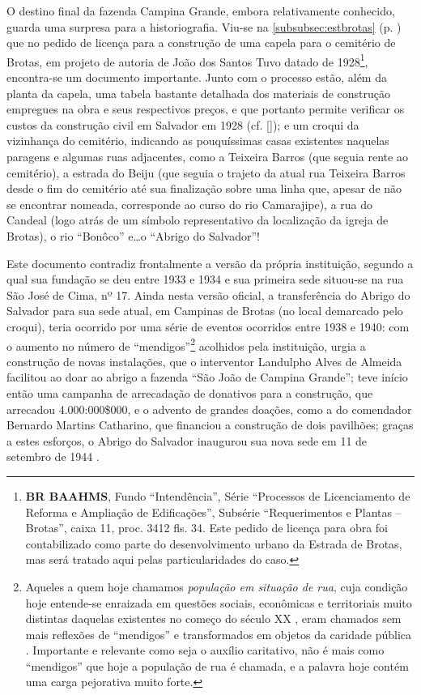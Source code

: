 O destino final da fazenda Campina Grande, embora relativamente conhecido, guarda uma surpresa para a historiografia. Viu-se na \autoref{subsubsec:estbrotas} (p. \pageref{subsubsec:estbrotas}) que no pedido de licença para a construção de uma capela para o cemitério de Brotas, em projeto de autoria de João dos Santos Tuvo datado de 1928\footnote{\textbf{BR BAAHMS}, Fundo ``Intendência'', Série ``Processos de Licenciamento de Reforma e Ampliação de Edificações'', Subsérie ``Requerimentos e Plantas -- Brotas'', caixa 11, proc. 3412 fls. 34. Este pedido de licença para obra foi contabilizado como parte do desenvolvimento urbano da Estrada de Brotas, mas será tratado aqui pelas particularidades do caso.}, encontra-se um documento importante. Junto com o processo estão, além da planta da capela, uma tabela bastante detalhada dos materiais de construção empregues na obra e seus respectivos preços, e que portanto permite verificar os custos da construção civil em Salvador em 1928 (cf. \autoref{}); e um croqui da vizinhança do cemitério, indicando as pouquíssimas casas existentes naquelas paragens e algumas ruas adjacentes, como a Teixeira Barros (que seguia rente ao cemitério), a estrada do Beiju (que seguia o trajeto da atual rua Teixeira Barros desde o fim do cemitério até sua finalização sobre uma linha que, apesar de não se encontrar nomeada, corresponde ao curso do rio Camarajipe), a rua do Candeal (logo atrás de um símbolo representativo da localização da igreja de Brotas), o rio ``Bonôco'' e\dots o ``Abrigo do Salvador''!

Este documento contradiz frontalmente a versão da própria instituição, segundo a qual sua fundação se deu entre 1933 e 1934 e sua primeira sede situou-se na rua São José de Cima, nº 17. Ainda nesta versão oficial, a transferência do Abrigo do Salvador para sua sede atual, em Campinas de Brotas (no local demarcado pelo croqui), teria ocorrido por uma série de eventos ocorridos entre 1938 e 1940: com o aumento no número de ``mendigos''\footnote{Aqueles a quem hoje chamamos \textit{população em situação de rua}, cuja condição hoje entende-se enraizada em questões sociais, econômicas e territoriais muito distintas daquelas existentes no começo do século XX \cite{snow_desafortunados_1998}, eram chamados sem mais reflexões de ``mendigos'' e transformados em objetos da caridade pública \cite{fraga_mendigos_1996}. Importante e relevante como seja o auxílio caritativo, não é mais como ``mendigos'' que hoje a população de rua é chamada, e a palavra hoje contém uma carga pejorativa muito forte.} acolhidos pela instituição, urgia a construção de novas instalações, que o interventor Landulpho Alves de Almeida facilitou ao doar ao abrigo a fazenda ``São João de Campina Grande''; teve início então uma campanha de arrecadação de donativos para a construção, que arrecadou 4.000:000\$000, e o advento de grandes doações, como a do comendador Bernardo Martins Catharino, que financiou a construção de dois pavilhões; graças a estes esforços, o Abrigo do Salvador inaugurou sua nova sede em 11 de setembro de 1944 \cite{abrigosalvador_2015}. 

